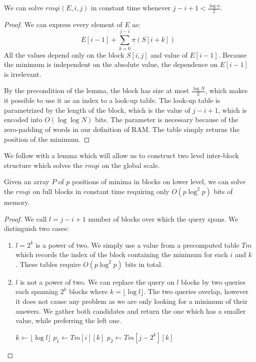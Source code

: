 \bigskip

\begin{lemma}\label{lemma:rmq1}
We can solve $rmqi(E, i, j)$ in constant time whenever $j - i + 1 < \frac{\log n}{2}$.
\end{lemma}
\begin{proof}
We can express every element of $E$ as:
$$E[i-1] + \sum_{k = 0}^{j-i} \pi(S[i + k])$$
All the values depend only on the block $S[i, j]$ and value of $E[i-1]$.
Because the minimum is independent on the absolute value, the dependence on $E[i-1]$ is irrelevant.

By the precondition of the lemma, the block has size at most $\frac{\log N}{2}$, which makes it possible to use it as an index to a look-up table.
The look-up table is parametrized by the length of the block, which is the value of $j - i + 1$, which is encoded into $O(\log \log N)$ bits.
The parameter is necessary because of the zero-padding of words in our definition of RAM.
The table simply returns the position of the minimum.
\end{proof}

We follow with a lemma which will allow us to construct two level inter-block structure which solves the $rmqi$ on the global scale.

\begin{lemma}\label{lemma:rmq2}
Given an array $P$ of $p$ positions of minima in blocks on lower level, we can solve the $rmqi$ on full blocks in constant time requiring only $O(p \log^2 p)$ bits of memory.
\end{lemma}
\begin{proof}
We call $l = j - i + 1$ number of blocks over which the query spans.
We distinguish two cases:
\begin{enumerate}
	\item $l = 2^k$ is a power of two.
	We simply use a value from a precomputed table $Tm$ which records the index of the block containing the minimum for each $i$ and $k$.
	These tables require $O(p \log^2 p)$ bits in total.
	\item $l$ is not a power of two.
	We can replace the query on $l$ blocks by two queries each spanning $2^k$ blocks where $k = \lfloor \log l \rfloor$.
	The two queries overlap, however it does not cause any problem as we are only looking for a minimum of their answers.
	We gather both candidates and return the one which has a smaller value, while preferring the left one.
	
	\begin{algorithmic}
		\State $k \gets \lfloor \log l \rfloor$
		\State $p_1 \gets Tm[i][k]$
		\State $p_2 \gets Tm[j-2^k][k]$
			\State {}
		\Else
			\State {}
		\EndIf
	\EndFunction
	\end{algorithmic}
\end{enumerate}
\end{proof}

